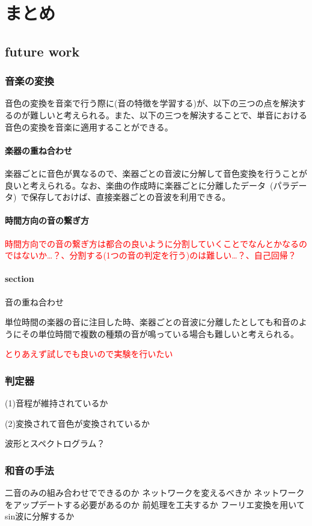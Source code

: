 \chapter{まとめ}


\section{future work}



\subsection{音楽の変換}


音色の変換を音楽で行う際に(音の特徴を学習する)が、以下の三つの点を解決するのが難しいと考えられる。また、以下の三つを解決することで、単音における音色の変換を音楽に適用することができる。

\subsubsection{楽器の重ね合わせ}

楽器ごとに音色が異なるので、楽器ごとの音波に分解して音色変換を行うことが良いと考えられる。なお、楽曲の作成時に楽器ごとに分離したデータ~(パラデータ)~で保存しておけば、直接楽器ごとの音波を利用できる。


\subsubsection{時間方向の音の繋ぎ方}

\textcolor{red}{時間方向での音の繋ぎ方は都合の良いように分割していくことでなんとかなるのではないか…？、分割する(1つの音の判定を行う)のは難しい…？、自己回帰？}

\subsubsection{section}{音の重ね合わせ}

単位時間の楽器の音に注目した時、楽器ごとの音波に分離したとしても和音のようにその単位時間で複数の種類の音が鳴っている場合も難しいと考えられる。

\textcolor{red}{とりあえず試しでも良いので実験を行いたい}



\subsection{判定器}

(1)音程が維持されているか

(2)変換されて音色が変換されているか

波形とスペクトログラム？



\subsection{和音の手法}

二音のみの組み合わせでできるのか
ネットワークを変えるべきか
ネットワークをアップデートする必要があるのか
前処理を工夫するか
フーリエ変換を用いてsin波に分解するか